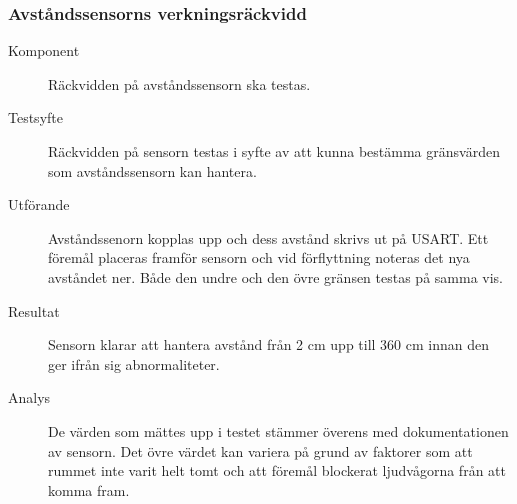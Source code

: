 \documentclass[a4paper]{article}
\begin{document}
\subsubsection{Avståndssensorns verkningsräckvidd}
\label{A:avstand}
\begin{description}
\item[Komponent] Räckvidden på avståndssensorn ska testas.

\item[Testsyfte] Räckvidden på sensorn testas i syfte av att kunna bestämma gränsvärden som avståndssensorn kan hantera.

\item[Utförande] Avståndssenorn kopplas upp och dess avstånd skrivs ut på USART.
Ett föremål placeras framför sensorn och vid förflyttning noteras det nya avståndet ner.
Både den undre och den övre gränsen testas på samma vis. 

\item[Resultat] Sensorn klarar att hantera avstånd från 2 cm upp till 360 cm innan den ger ifrån sig abnormaliteter.

\item[Analys] De värden som mättes upp i testet stämmer överens med dokumentationen av sensorn.
Det övre värdet kan variera på grund av faktorer som att rummet inte varit helt tomt och att föremål blockerat ljudvågorna från att komma fram.

\end{description}
\end{document}

